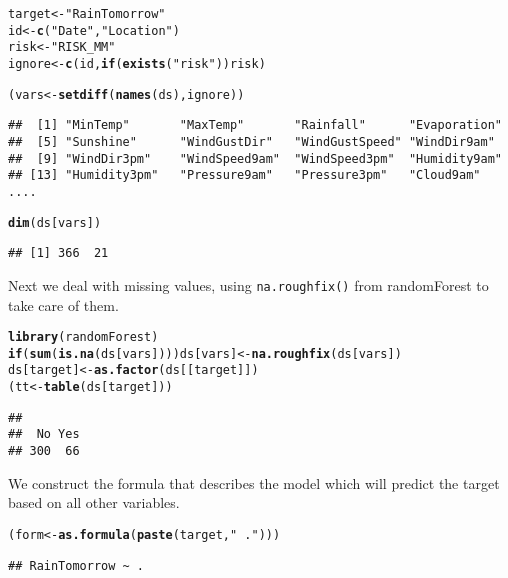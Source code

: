 \documentclass[11pt,a4paper]{article}\usepackage{graphicx, color}
\makeatletter
\newcommand{\hlfunctioncall}[1]{\textcolor[rgb]{0.501960784313725,0,0.329411764705882}{\textbf{#1}}}%
\newcommand{\hlstring}[1]{\textcolor[rgb]{0.6,0.6,1}{#1}}%
\newenvironment{kframe}{%
 \def\at@end@of@kframe{}%
 \ifinner\ifhmode%
  \def\at@end@of@kframe{\end{minipage}}%
  \begin{minipage}{\columnwidth}%
 \fi\fi%
 \def\FrameCommand##1{\hskip\@totalleftmargin \hskip-\fboxsep
 \colorbox{shadecolor}{##1}\hskip-\fboxsep
     \hskip-\linewidth \hskip-\@totalleftmargin \hskip\columnwidth}%
 \MakeFramed {\advance\hsize-\width
   \@totalleftmargin\z@ \linewidth\hsize
   \@setminipage}}%
 {\par\unskip\endMakeFramed%
 \at@end@of@kframe}
\newenvironment{knitrout}{}{} %
\newcommand{\pkg}[1]{{\fontseries{b}\selectfont #1}}
\makeatother
\begin{document}
\begin{knitrout}
\color{fgcolor}\begin{kframe}
\begin{alltt}
target <- \hlstring{"RainTomorrow"}
id     <- \hlfunctioncall{c}(\hlstring{"Date"}, \hlstring{"Location"})
risk   <- \hlstring{"RISK_MM"}
ignore <- \hlfunctioncall{c}(id, \hlfunctioncall{if} (\hlfunctioncall{exists}(\hlstring{"risk"})) risk)

(vars <- \hlfunctioncall{setdiff}(\hlfunctioncall{names}(ds), ignore))
\end{alltt}
\begin{verbatim}
##  [1] "MinTemp"       "MaxTemp"       "Rainfall"      "Evaporation"  
##  [5] "Sunshine"      "WindGustDir"   "WindGustSpeed" "WindDir9am"   
##  [9] "WindDir3pm"    "WindSpeed9am"  "WindSpeed3pm"  "Humidity9am"  
## [13] "Humidity3pm"   "Pressure9am"   "Pressure3pm"   "Cloud9am"     
....
\end{verbatim}
\begin{alltt}
\hlfunctioncall{dim}(ds[vars])
\end{alltt}
\begin{verbatim}
## [1] 366  21
\end{verbatim}
\end{kframe}
\end{knitrout}


Next we deal with missing values, using \texttt{na.roughfix()} from
\pkg{randomForest} to take care of them.

\begin{knitrout}
\color{fgcolor}\begin{kframe}
\begin{alltt}
\hlfunctioncall{library}(randomForest)
\hlfunctioncall{if} (\hlfunctioncall{sum}(\hlfunctioncall{is.na}(ds[vars]))) ds[vars] <- \hlfunctioncall{na.roughfix}(ds[vars])
ds[target] <- \hlfunctioncall{as.factor}(ds[[target]])
(tt <- \hlfunctioncall{table}(ds[target]))
\end{alltt}
\begin{verbatim}
## 
##  No Yes 
## 300  66
\end{verbatim}
\end{kframe}
\end{knitrout}


We construct the formula that describes the model which will predict
the target based on all other variables.

\begin{knitrout}
\color{fgcolor}\begin{kframe}
\begin{alltt}
(form <- \hlfunctioncall{as.formula}(\hlfunctioncall{paste}(target, \hlstring{"~ ."})))
\end{alltt}
\begin{verbatim}
## RainTomorrow ~ .
\end{verbatim}
\end{kframe}
\end{knitrout}
\end{document}
